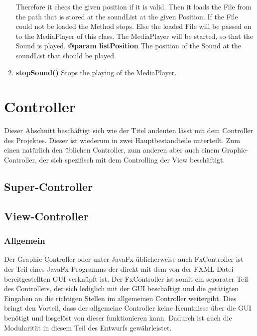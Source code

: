 \documentclass{article}
\begin{document}
\begin{enumerate}[+]
{					Therefore it checs the given position if it is valid.
					Then it loads the File from the path that is stored at the soundList at the given Position.
					If the File could not be loaded the Method stops.
					Else the loaded File will be passed on to the MediaPlayer of this class.
					The MediaPlayer will be started, so that the Sound is played.
					\newline
					\textbf{@param listPosition}
						The position of the Sound at the soundList that should be played.
						\newline
				}
				\item{
					\textbf{stopSound()} \newline
					Stops the playing of the MediaPlayer.
					\newline
				}
			\end{enumerate}
	
	
	\section{Controller}
	Dieser Abschnitt beschäftigt sich wie der Titel andeuten lässt mit dem Controller des Projektes.
	Dieser ist wiederum in zwei Hauptbestandteile unterteilt.
		Zum einen natürlich den üblichen Controller, zum anderen aber auch einem Graphic-Controller, der sich spezifisch mit dem Controlling der View beschäftigt.
	
	\subsection{Super-Controller}
	
	\subsection{View-Controller}
	\subsubsection{Allgemein}
		Der Graphic-Controller oder unter JavaFx üblicherweise auch FxController ist der Teil eines JavaFx-Programms der direkt mit dem von der FXML-Datei bereitgestellten GUI verknüpft ist.
		Der FxController ist somit ein separater Teil des Controllers, der sich lediglich mit der GUI beschäftigt und die getätigten Eingaben an die richtigen Stellen im allgemeinen Controller weitergibt.
			Dies bringt den Vorteil, dass der allgemeine Controller keine Kenntnisse über die GUI benötigt und losgelöst von dieser funktionieren kann.
			Dadurch ist auch die Modularität in diesem Teil des Entwurfs gewährleistet.
\end{document}
